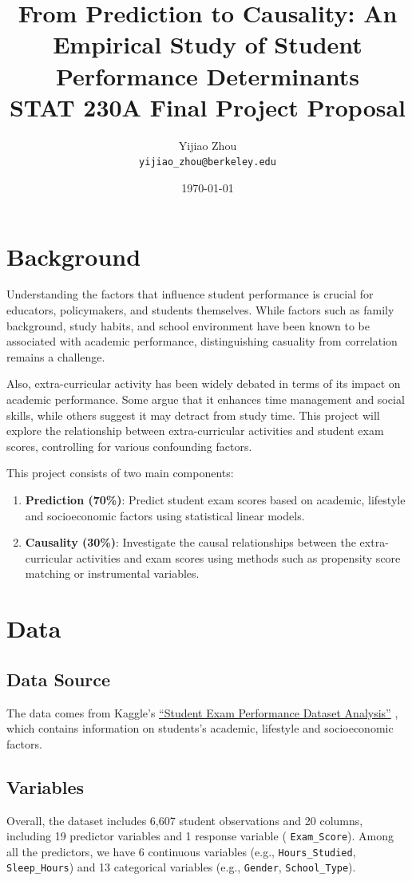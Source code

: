 \documentclass[11pt]{article}
\title{From Prediction to Causality: An Empirical Study of Student Performance Determinants\\[4pt]\large STAT 230A Final Project Proposal}
\author{Yijiao Zhou\\ \texttt{yijiao\_zhou@berkeley.edu}}
\date{\today}
\begin{document}
\maketitle

\section{Background}

Understanding the factors that influence student performance is crucial for educators, policymakers, and students themselves. While factors such as family background, study habits, and school environment have been known to be associated with academic performance, distinguishing casuality from correlation remains a challenge. 

Also, extra-curricular activity has been widely debated in terms of its impact on academic performance. Some argue that it enhances time management and social skills, while others suggest it may detract from study time. This project will explore the relationship between extra-curricular activities and student exam scores, controlling for various confounding factors.

This project consists of two main components:
\begin{enumerate}
    \item \textbf{Prediction (70\%)}: Predict student exam scores based on academic, lifestyle and socioeconomic factors using statistical linear models.
    \item \textbf{Causality (30\%)}: Investigate the causal relationships between the extra-curricular activities and exam scores using methods such as propensity score matching or instrumental variables.
\end{enumerate}

\section{Data}
\subsection{Data Source}

The data comes from Kaggle's \href{https://www.kaggle.com/datasets/grandmaster07/student-exam-performance-dataset-analysis/data}{ ``Student Exam Performance Dataset Analysis''} \cite{kaggle_student_performance}, which contains information on students's academic, lifestyle and socioeconomic factors. 

\subsection{Variables}
Overall, the dataset includes 6,607 student observations and 20 columns, including 19 predictor variables and 1 response variable ( \texttt{Exam\_Score}). Among all the predictors, we have 6 continuous variables (e.g., \texttt{Hours\_Studied}, \texttt{Sleep\_Hours}) and  13 categorical variables (e.g., \texttt{Gender}, \texttt{School\_Type}). 
\end{document}
